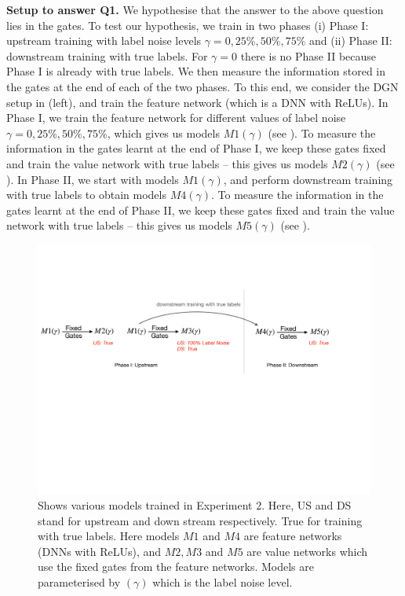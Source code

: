 \textbf{Setup to answer Q1.} We hypothesise that the answer to the above question lies in the gates. To test our hypothesis, we train in two phases (i) Phase I: upstream training with label noise levels $\gamma=0, 25\%, 50\%, 75\%$ and (ii) Phase II: downstream training with true labels. For $\gamma=0$ there is no Phase II because Phase I is already with true labels. We then measure the information stored in the gates at the end of each of the two phases. To this end, we consider the DGN setup in  (left), and train the feature network (which is a DNN with ReLUs). In Phase I, we train the feature network for different values of label noise $\gamma=0, 25\%, 50\%, 75\%$, which gives us models $M1(\gamma)$ (see ). To measure the information in the gates learnt at the end of Phase I, we keep these gates fixed and train the value network with true labels -- this gives us models $M2(\gamma)$ (see ). In Phase II, we start with models $M1(\gamma)$, and perform downstream training with true labels to obtain models $M4(\gamma)$.  To measure the information in the gates learnt at the end of Phase II, we keep these gates fixed and train the value network with true labels -- this gives us models $M5(\gamma)$ (see ).

\begin{figure}[h]
\centering
\includegraphics[scale=0.3]{figs/rand-label-big.pdf}
\caption{Shows various models trained in Experiment 2. Here, US and DS stand for upstream and down stream respectively. True for training with true labels. Here models $M1$ and $M4$ are feature networks (DNNs with ReLUs), and $M2, M3$ and $M5$ are value networks which use the fixed gates from the feature networks. Models are parameterised by $(\gamma)$ which is the label noise level.}
\label{fig:rand-label-setup}
\end{figure}


